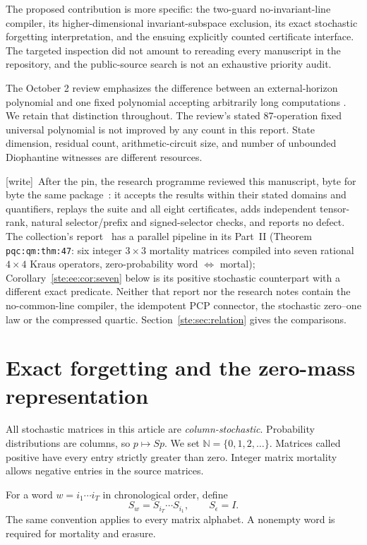 \documentclass[11pt,letterpaper]{article}
\theoremstyle{definition}
\theoremstyle{remark}
\newcommand{\N}{\mathbb N}
\newcommand{\wtag}{\textup{[write]}}
\begin{document}
The proposed contribution is more specific: the two-guard no-invariant-line
compiler, its higher-dimensional invariant-subspace exclusion, its exact
stochastic forgetting interpretation, and the ensuing explicitly counted
certificate interface. The targeted inspection did not amount to rereading every
manuscript in the repository, and the public-source search is not an exhaustive
priority audit.

The October 2 review emphasizes the difference between an external-horizon
polynomial and one fixed polynomial accepting arbitrarily long computations
\cite{repoReview}. We retain that distinction throughout. The review's stated
87-operation fixed universal polynomial is not improved by any count in this
report. State dimension, residual count, arithmetic-circuit size, and number of
unbounded Diophantine witnesses are different resources.

\wtag\ After the pin, the research programme reviewed this manuscript, byte for byte the same package~\cite{review1977}: it accepts the results within their stated domains and quantifiers, replays the suite and all eight certificates, adds independent tensor-rank, natural selector/prefix and signed-selector checks, and reports no defect. The collection's report~\cite{pqc} has a parallel pipeline in its Part~II (Theorem \texttt{pqc:qm:thm:47}: six integer $3\times3$ mortality matrices compiled into seven rational $4\times4$ Kraus operators, zero-probability word $\Leftrightarrow$ mortal); Corollary~\ref{ste:ee:cor:seven} below is its positive stochastic counterpart with a different exact predicate. Neither that report nor the research notes contain the no-common-line compiler, the idempotent PCP connector, the stochastic zero--one law or the compressed quartic. Section~\ref{ste:sec:relation} gives the comparisons.

\section{Exact forgetting and the zero-mass representation}
\label{ste:ee:sec:setup}

All stochastic matrices in this article are \emph{column-stochastic}. Probability
distributions are columns, so $p\mapsto Sp$. We set $\N=\{0,1,2,\ldots\}$.
Matrices called positive have every entry strictly greater than zero. Integer
matrix mortality allows negative entries in the source matrices.

For a word $w=i_1\cdots i_T$ in chronological order, define
\[
 S_w=S_{i_T}\cdots S_{i_1},\qquad S_\epsilon=I.
\]
The same convention applies to every matrix alphabet. A nonempty word is required
for mortality and erasure.
\end{document}
